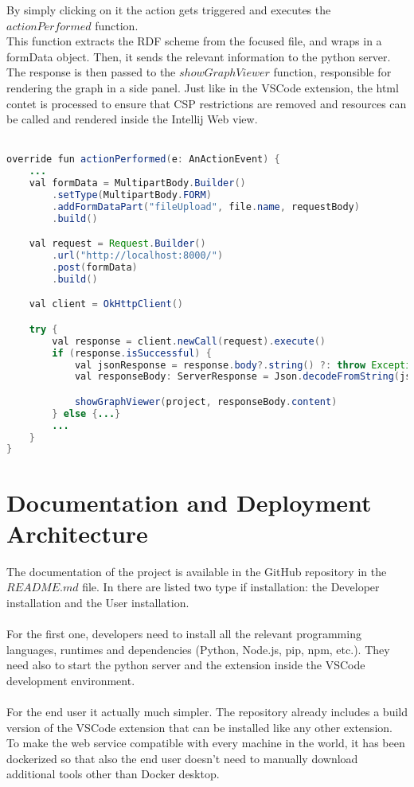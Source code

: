 By simply clicking on it the action gets triggered and executes the $actionPerformed$ function. 
\\
This function extracts the RDF scheme from the focused file, and wraps in a formData object. Then, it sends the relevant information to the python server. 
The response is then passed to the $showGraphViewer$ function, responsible for rendering the graph in a side panel.
Just like in the VSCode extension, the html contet is processed to ensure that CSP restrictions are removed and resources can be called and rendered inside the Intellij Web view. 
\\
\\
\begin{lstlisting}[caption={Render graph in WebView in IntelliJ}, label={lst:open-web-view-intellij}, language=Java]
override fun actionPerformed(e: AnActionEvent) {
	...
	val formData = MultipartBody.Builder()
		.setType(MultipartBody.FORM)
		.addFormDataPart("fileUpload", file.name, requestBody)
		.build()

	val request = Request.Builder()
		.url("http://localhost:8000/")
		.post(formData)
		.build()

	val client = OkHttpClient()

	try {
		val response = client.newCall(request).execute()
		if (response.isSuccessful) {
			val jsonResponse = response.body?.string() ?: throw Exception("Empty response body")
			val responseBody: ServerResponse = Json.decodeFromString(jsonResponse)

			showGraphViewer(project, responseBody.content)
		} else {...}
		...
	}
}
\end{lstlisting}

\section{Documentation and Deployment Architecture\label{sec:docu}}
The documentation of the project is available in the GitHub repository in the $README.md$ file. 
In there are listed two type if installation: the Developer installation and the User installation. 
\\
\\
For the first one, developers need to install all the relevant programming languages, runtimes and dependencies (Python, Node.js, pip, npm, etc.). 
They need also to start the python server and the extension inside the VSCode development environment.
\\ 
\\
For the end user it actually much simpler. The repository already includes a build version of the VSCode extension that can be installed like any other extension. 
\\
To make the web service compatible with every machine in the world, it has been dockerized so that also the end user doesn't need to manually download additional tools other than Docker desktop.


